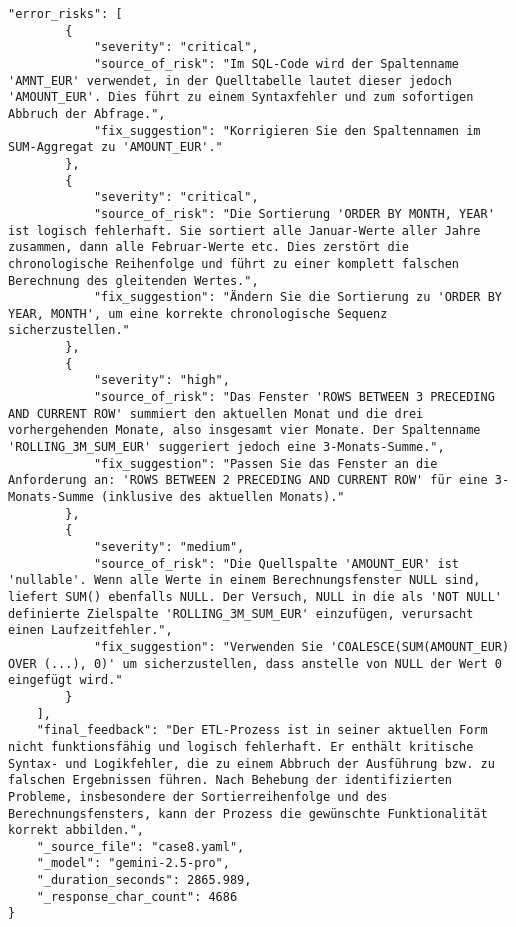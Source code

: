 \begin{lstlisting}[caption={Ausgabe: Gemini 2.5 Pro Anwendungsfall 8 Robustheitsdurchlauf},label={gemini_case8_prompt3}]
    "error_risks": [
        {
            "severity": "critical",
            "source_of_risk": "Im SQL-Code wird der Spaltenname 'AMNT_EUR' verwendet, in der Quelltabelle lautet dieser jedoch 'AMOUNT_EUR'. Dies führt zu einem Syntaxfehler und zum sofortigen Abbruch der Abfrage.",
            "fix_suggestion": "Korrigieren Sie den Spaltennamen im SUM-Aggregat zu 'AMOUNT_EUR'."
        },
        {
            "severity": "critical",
            "source_of_risk": "Die Sortierung 'ORDER BY MONTH, YEAR' ist logisch fehlerhaft. Sie sortiert alle Januar-Werte aller Jahre zusammen, dann alle Februar-Werte etc. Dies zerstört die chronologische Reihenfolge und führt zu einer komplett falschen Berechnung des gleitenden Wertes.",
            "fix_suggestion": "Ändern Sie die Sortierung zu 'ORDER BY YEAR, MONTH', um eine korrekte chronologische Sequenz sicherzustellen."
        },
        {
            "severity": "high",
            "source_of_risk": "Das Fenster 'ROWS BETWEEN 3 PRECEDING AND CURRENT ROW' summiert den aktuellen Monat und die drei vorhergehenden Monate, also insgesamt vier Monate. Der Spaltenname 'ROLLING_3M_SUM_EUR' suggeriert jedoch eine 3-Monats-Summe.",
            "fix_suggestion": "Passen Sie das Fenster an die Anforderung an: 'ROWS BETWEEN 2 PRECEDING AND CURRENT ROW' für eine 3-Monats-Summe (inklusive des aktuellen Monats)."
        },
        {
            "severity": "medium",
            "source_of_risk": "Die Quellspalte 'AMOUNT_EUR' ist 'nullable'. Wenn alle Werte in einem Berechnungsfenster NULL sind, liefert SUM() ebenfalls NULL. Der Versuch, NULL in die als 'NOT NULL' definierte Zielspalte 'ROLLING_3M_SUM_EUR' einzufügen, verursacht einen Laufzeitfehler.",
            "fix_suggestion": "Verwenden Sie 'COALESCE(SUM(AMOUNT_EUR) OVER (...), 0)' um sicherzustellen, dass anstelle von NULL der Wert 0 eingefügt wird."
        }
    ],
    "final_feedback": "Der ETL-Prozess ist in seiner aktuellen Form nicht funktionsfähig und logisch fehlerhaft. Er enthält kritische Syntax- und Logikfehler, die zu einem Abbruch der Ausführung bzw. zu falschen Ergebnissen führen. Nach Behebung der identifizierten Probleme, insbesondere der Sortierreihenfolge und des Berechnungsfensters, kann der Prozess die gewünschte Funktionalität korrekt abbilden.",
    "_source_file": "case8.yaml",
    "_model": "gemini-2.5-pro",
    "_duration_seconds": 2865.989,
    "_response_char_count": 4686
}
\end{lstlisting}

